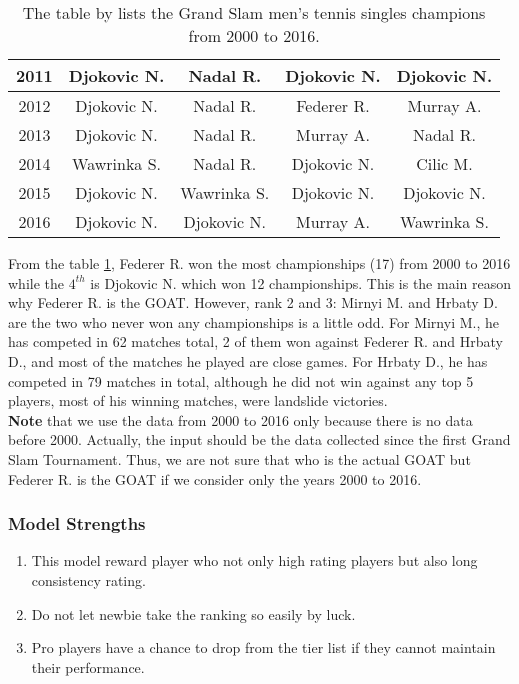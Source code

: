 \begin{table}[ht]
\begin{tabular}{|c|c|c|c|c|}
2011          & \cellcolor[HTML]{CBCEFB}Djokovic N. & \cellcolor[HTML]{B4FFB4}Nadal R.    & \cellcolor[HTML]{CBCEFB}Djokovic N. & \cellcolor[HTML]{CBCEFB}Djokovic N. \\ \hline
2012          & \cellcolor[HTML]{CBCEFB}Djokovic N. & \cellcolor[HTML]{B4FFB4}Nadal R.    & \cellcolor[HTML]{FFDDB3}Federer R.  & Murray A.                           \\ \hline
2013          & \cellcolor[HTML]{CBCEFB}Djokovic N. & \cellcolor[HTML]{B4FFB4}Nadal R.    & Murray A.                           & \cellcolor[HTML]{B4FFB4}Nadal R.    \\ \hline
2014          & Wawrinka S.                         & \cellcolor[HTML]{B4FFB4}Nadal R.    & \cellcolor[HTML]{CBCEFB}Djokovic N. & Cilic M.                            \\ \hline
2015          & \cellcolor[HTML]{CBCEFB}Djokovic N. & Wawrinka S.                         & \cellcolor[HTML]{CBCEFB}Djokovic N. & \cellcolor[HTML]{CBCEFB}Djokovic N. \\ \hline
2016          & \cellcolor[HTML]{CBCEFB}Djokovic N. & \cellcolor[HTML]{CBCEFB}Djokovic N. & Murray A.                           & Wawrinka S.                         \\ \hline
\end{tabular}
\caption{The table by \cite{GLW} lists the Grand Slam men's tennis singles champions from 2000 to 2016.}
\label{tab_champ}
\end{table}


From the table \ref{tab_champ}, Federer R. won the most championships (17) from 2000 to 2016 while the $4^{th}$ is Djokovic N. which won 12 championships. This is the main reason why Federer R. is the GOAT. However, rank 2 and 3: Mirnyi M. and Hrbaty D. are the two who never won any championships is a little odd. For Mirnyi M., he has competed in 62 matches total, 2 of them won against Federer R. and Hrbaty D., and most of the matches he played are close games. For Hrbaty D., he has competed in 79 matches in total, although he did not win against any top 5 players, most of his winning matches, were landslide victories.\\
\textbf{Note} that we use the data from 2000 to 2016 only because there is no data before 2000. Actually, the input should be the data collected since the first Grand Slam Tournament. Thus, we are not sure that who is the actual GOAT but Federer R. is the GOAT if we consider only the years 2000 to 2016.%
\subsubsection{Model Strengths}
\begin{enumerate}
    \item This model reward player who not only high rating players but also long consistency rating.
    \item Do not let newbie take the ranking so easily by luck.
    \item Pro players have a chance to drop from the tier list if they cannot maintain their performance. %
\end{enumerate}
